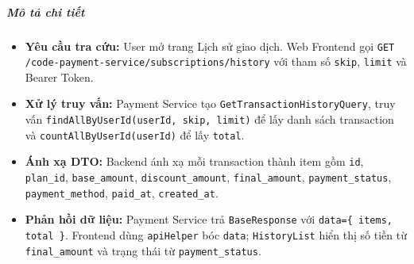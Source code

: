 \subparagraph{Mô tả chi tiết}
\begin{itemize}
\item \textbf{Yêu cầu tra cứu:} User mở trang Lịch sử giao dịch. Web Frontend gọi \texttt{GET /code-payment-service/subscriptions/history} với tham số \texttt{skip}, \texttt{limit} và Bearer Token.
\item \textbf{Xử lý truy vấn:} Payment Service tạo \texttt{GetTransactionHistoryQuery}, truy vấn \texttt{findAllByUserId(userId, skip, limit)} để lấy danh sách transaction và \texttt{countAllByUserId(userId)} để lấy \texttt{total}.
\item \textbf{Ánh xạ DTO:} Backend ánh xạ mỗi transaction thành item gồm \texttt{id}, \texttt{plan\_id}, \texttt{base\_amount}, \texttt{discount\_amount}, \texttt{final\_amount}, \texttt{payment\_status}, \texttt{payment\_method}, \texttt{paid\_at}, \texttt{created\_at}.
\item \textbf{Phản hồi dữ liệu:} Payment Service trả \texttt{BaseResponse} với \texttt{data=\{ items, total \}}. Frontend dùng \texttt{apiHelper} bóc \texttt{data}; \texttt{HistoryList} hiển thị số tiền từ \texttt{final\_amount} và trạng thái từ \texttt{payment\_status}.
\end{itemize}
